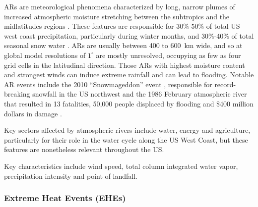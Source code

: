 \documentclass[11pt]{article}
\newcommand\citep{\cite}
\begin{document}
ARs are meteorological phenomena characterized by long, narrow plumes of increased atmospheric moisture stretching between the subtropics and the midlatitudes regions \citep{ralph2011storms}.  These features are responsible for 30\%-50\% of total US west coast precipitation, particularly during winter months, and 30\%-40\% of total seasonal snow water \citep{dettinger2011atmospheric, warner2012wintertime}.  ARs are usually between 400 to 600\ km wide, and so at global model resolutions of $1^\circ$ are mostly unresolved, occupying as few as four grid cells in the latitudinal direction.  Those ARs with highest moisture content and strongest winds can induce extreme rainfall and can lead to flooding.  Notable AR events include the 2010 ``Snowmageddon'' event \citep{halverson2010mega}, responsible for record-breaking snowfall in the US northwest and the 1986 February atmospheric river that resulted in 13 fatalities, 50,000 people displaced by flooding and \$400 million dollars in damage \citep{leung2009atmospheric}.






Key sectors affected by atmospheric rivers include water, energy and agriculture, particularly for their role in the water cycle along the US West Coast, but these features are nonetheless relevant throughout the US.

Key characteristics include wind speed, total column integrated water vapor, precipitation intensity and point of landfall.

\subsubsection*{Extreme Heat Events (EHEs)}
\end{document}
